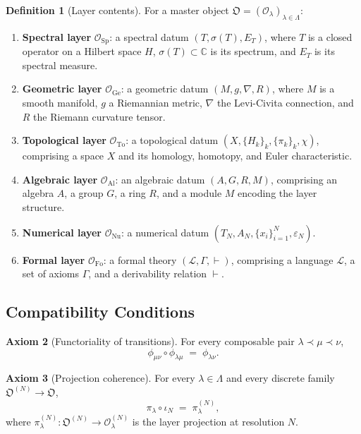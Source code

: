 \documentclass[11pt,a4paper]{article}
\theoremstyle{definition}
\newtheorem{definition}{Definition}[section]
\newtheorem{axiom}[definition]{Axiom}
\theoremstyle{plain}
\newcommand{\Lam}{\Lambda}
\newcommand{\Sp}{\mathrm{Sp}}
\newcommand{\Ge}{\mathrm{Ge}}
\newcommand{\To}{\mathrm{To}}
\newcommand{\Al}{\mathrm{Al}}
\newcommand{\Nu}{\mathrm{Nu}}
\newcommand{\Fo}{\mathrm{Fo}}
\newcommand{\Ob}{\mathfrak{O}}
\newcommand{\Ocal}{\mathcal{O}}
\newcommand{\philam}{\phi_{\lambda\mu}}
\begin{document}
\begin{definition}[Layer contents]
For a master object $\Ob = (\Ocal_\lambda)_{\lambda \in \Lam}$:
\begin{enumerate}[label=\textbf{(\roman*)}]
  \item \textbf{Spectral layer} $\Ocal_\Sp$: a spectral datum
        $(T, \sigma(T), E_T)$, where $T$ is a closed operator on a
        Hilbert space $H$, $\sigma(T) \subset \mathbb{C}$ is its
        spectrum, and $E_T$ is its spectral measure.
  \item \textbf{Geometric layer} $\Ocal_\Ge$: a geometric datum
        $(M, g, \nabla, R)$, where $M$ is a smooth manifold, $g$ a
        Riemannian metric, $\nabla$ the Levi-Civita connection, and
        $R$ the Riemann curvature tensor.
  \item \textbf{Topological layer} $\Ocal_\To$: a topological datum
        $(X, \{H_k\}_k, \{\pi_k\}_k, \chi)$, comprising a space $X$
        and its homology, homotopy, and Euler characteristic.
  \item \textbf{Algebraic layer} $\Ocal_\Al$: an algebraic datum
        $(A, G, R, M)$, comprising an algebra $A$, a group $G$, a
        ring $R$, and a module $M$ encoding the layer structure.
  \item \textbf{Numerical layer} $\Ocal_\Nu$: a numerical datum
        $(T_N, A_N, \{x_i\}_{i=1}^N, \varepsilon_N)$.
  \item \textbf{Formal layer} $\Ocal_\Fo$: a formal theory
        $(\mathcal{L}, \Gamma, \vdash)$, comprising a language
        $\mathcal{L}$, a set of axioms $\Gamma$, and a derivability
        relation $\vdash$.
\end{enumerate}
\end{definition}

\subsection{Compatibility Conditions}

\begin{axiom}[Functoriality of transitions]\label{ax:funct}
For every composable pair $\lambda \prec \mu \prec \nu$,
\[
  \phi_{\mu\nu} \circ \philam
  \;=\;
  \phi_{\lambda\nu} .
\]
\end{axiom}

\begin{axiom}[Projection coherence]\label{ax:proj}
For every $\lambda \in \Lam$ and every discrete family
$\Ob^{(N)} \to \Ob$,
\[
  \pi_\lambda \circ \iota_N
  \;=\;
  \pi^{(N)}_\lambda ,
\]
where $\pi^{(N)}_\lambda : \Ob^{(N)} \to \Ocal^{(N)}_\lambda$ is the
layer projection at resolution $N$.
\end{axiom}
\end{document}
